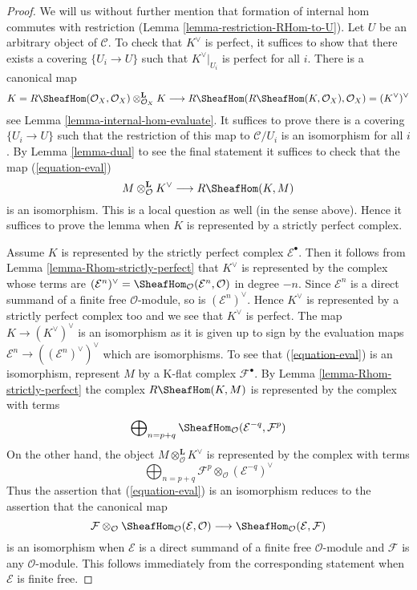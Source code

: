 \begin{proof}
We will us without further mention that formation of internal hom commutes
with restriction (Lemma \ref{lemma-restriction-RHom-to-U}). Let $U$
be an arbitrary object of $\mathcal{C}$. To check that
$K^\vee$ is perfect, it suffices to show that there exists a covering
$\{U_i \to U\}$ such that $K^\vee|_{U_i}$ is perfect for all $i$.
There is a canonical map
$$
K = R\SheafHom(\mathcal{O}_X, \mathcal{O}_X)
\otimes_{\mathcal{O}_X}^\mathbf{L} K \longrightarrow
R\SheafHom(R\SheafHom(K, \mathcal{O}_X), \mathcal{O}_X) =
(K^\vee)^\vee
$$
see Lemma \ref{lemma-internal-hom-evaluate}. It suffices to prove there
is a covering $\{U_i \to U\}$ such that the restriction of this map
to $\mathcal{C}/U_i$ is an isomorphism for all $i$.
By Lemma \ref{lemma-dual} to see the final statement it suffices to check
that the map (\ref{equation-eval})
$$
M \otimes^\mathbf{L}_\mathcal{O} K^\vee
\longrightarrow
R\SheafHom(K, M)
$$
is an isomorphism. This is a local question as well (in the sense above).
Hence it suffices to prove the lemma when $K$ is represented
by a strictly perfect complex.

\medskip\noindent
Assume $K$ is represented by the strictly perfect complex
$\mathcal{E}^\bullet$. Then it follows from
Lemma \ref{lemma-Rhom-strictly-perfect}
that $K^\vee$ is represented by the complex whose terms are
$(\mathcal{E}^n)^\vee =
\SheafHom_\mathcal{O}(\mathcal{E}^n, \mathcal{O})$
in degree $-n$. Since $\mathcal{E}^n$ is a direct summand of a finite
free $\mathcal{O}$-module, so is $(\mathcal{E}^n)^\vee$.
Hence $K^\vee$ is represented by a strictly perfect complex too 
and we see that $K^\vee$ is perfect.
The map $K \to (K^\vee)^\vee$ is an isomorphism as it is given up
to sign by the evaluation maps
$\mathcal{E}^n \to ((\mathcal{E}^n)^\vee)^\vee$ which are
isomorphisms. To see that (\ref{equation-eval}) is an isomorphism, represent
$M$ by a K-flat complex $\mathcal{F}^\bullet$.
By Lemma \ref{lemma-Rhom-strictly-perfect} the complex
$R\SheafHom(K, M)$ is represented by the complex with terms
$$
\bigoplus\nolimits_{n = p + q}
\SheafHom_\mathcal{O}(\mathcal{E}^{-q}, \mathcal{F}^p)
$$
On the other hand, the object $M \otimes^\mathbf{L}_\mathcal{O} K^\vee$
is represented by the complex with terms
$$
\bigoplus\nolimits_{n = p + q}
\mathcal{F}^p \otimes_\mathcal{O} (\mathcal{E}^{-q})^\vee
$$
Thus the assertion that (\ref{equation-eval}) is an isomorphism
reduces to the assertion that the canonical map
$$
\mathcal{F}
\otimes_\mathcal{O}
\SheafHom_\mathcal{O}(\mathcal{E}, \mathcal{O})
\longrightarrow
\SheafHom_\mathcal{O}(\mathcal{E}, \mathcal{F})
$$
is an isomorphism when $\mathcal{E}$ is a direct summand of a finite
free $\mathcal{O}$-module and $\mathcal{F}$ is any $\mathcal{O}$-module.
This follows immediately from the corresponding statement when
$\mathcal{E}$ is finite free.
\end{proof}

